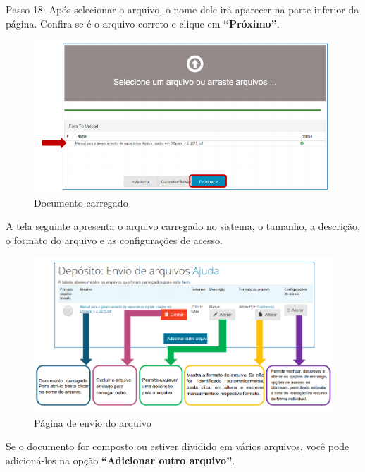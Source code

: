 \documentclass[12pt,hidelinks]{article}
\begin{document}
\newpage

    Passo 18: Após selecionar o arquivo, o nome dele irá aparecer na parte inferior da página. Confira se é o arquivo correto e clique em \textbf{“Próximo”}.
    
    \begin{figure}[!htp]
                \centering
                \includegraphics[scale=0.8]{figura/Figura157.png}
                \caption{Documento carregado}
            \label{Rotulo}
        \end{figure}
    
    A tela seguinte apresenta o arquivo carregado no sistema, o tamanho, a descrição, o formato do arquivo e as configurações de acesso.
    
    \begin{figure}[!htp]
                \centering
                \includegraphics[scale=0.7]{figura/Figura158.png}
                \caption{Página de envio do arquivo}
            \label{Rotulo}
        \end{figure}

\newpage
    
    Se o documento for composto ou estiver dividido em vários arquivos, você pode adicioná-los na opção \textbf{“Adicionar outro arquivo”}.
    
\end{document}
